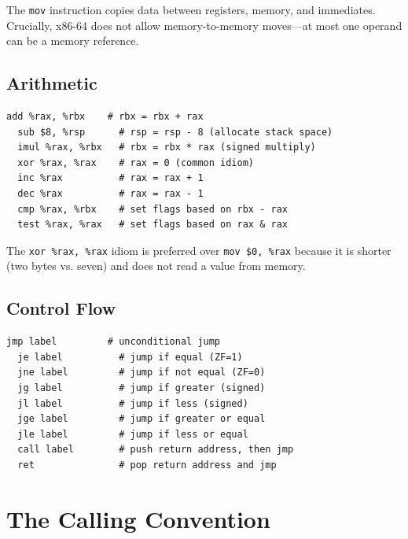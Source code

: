 The \texttt{mov} instruction copies data between registers, memory, and immediates. Crucially, x86-64 does not allow memory-to-memory moves---at most one operand can be a memory reference.


\subsection{Arithmetic}

\begin{lstlisting}[caption=Arithmetic instructions]
  add %rax, %rbx    # rbx = rbx + rax
  sub $8, %rsp      # rsp = rsp - 8 (allocate stack space)
  imul %rax, %rbx   # rbx = rbx * rax (signed multiply)
  xor %rax, %rax    # rax = 0 (common idiom)
  inc %rax          # rax = rax + 1
  dec %rax          # rax = rax - 1
  cmp %rax, %rbx    # set flags based on rbx - rax
  test %rax, %rax   # set flags based on rax & rax
\end{lstlisting}

The \texttt{xor \%rax, \%rax} idiom is preferred over \texttt{mov \$0, \%rax} because it is shorter (two bytes vs. seven) and does not read a value from memory.

\subsection{Control Flow}

\begin{lstlisting}[caption=Control flow instructions]
  jmp label         # unconditional jump
  je label          # jump if equal (ZF=1)
  jne label         # jump if not equal (ZF=0)
  jg label          # jump if greater (signed)
  jl label          # jump if less (signed)
  jge label         # jump if greater or equal
  jle label         # jump if less or equal
  call label        # push return address, then jmp
  ret               # pop return address and jmp
\end{lstlisting}

\section{The Calling Convention}
\label{sec:calling-conventions}

